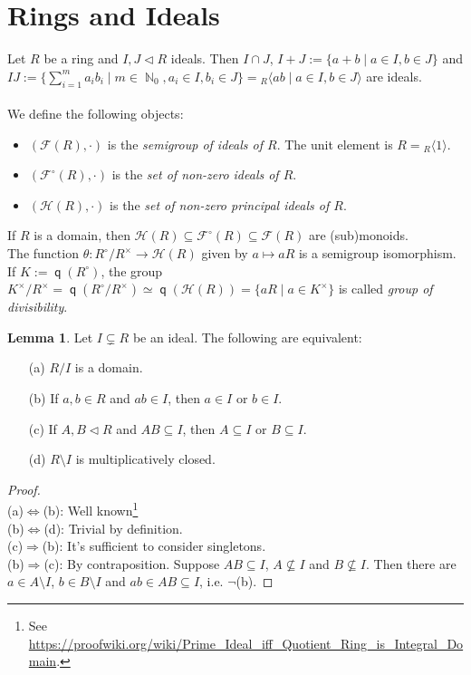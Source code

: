 \documentclass[12pt,a4paper]{report}
\theoremstyle{definition}
\newtheorem{lemma}[theorem]{Lemma}
\theoremstyle{num.custom-title}
\DeclareMathOperator{\N}{\mathbb{N}}
\DeclareMathOperator{\imp}{\Rightarrow}
\DeclareMathOperator{\sm}{\setminus}
\DeclareMathOperator{\sse}{\subseteq}
\DeclareMathOperator{\q}{\mathsf{q}}
\newcommand{\F}{\mathcal{F}}
\renewcommand{\H}{\mathcal{H}}
\renewcommand{\iff}{\Leftrightarrow}
\begin{document}
\section{Rings and Ideals}

Let $R$ be a ring and $I,J \lhd R$ ideals. Then $I \cap J$, $I+J := \{a+b \mid a \in I, b \in J\}$ and $IJ := \{\sum_{i=1}^m a_i b_i \mid m \in \N_0, a_i \in I, b_i \in J\} = {}_R\langle ab \mid a \in I, b \in J \rangle$ are ideals.\\
\\
We define the following objects:
\begin{itemize}
\item $(\F(R), \cdot)$ is the \emph{semigroup of ideals of $R$}. The unit element is $R={}_R\langle 1 \rangle$.
\item $(\F^\circ(R), \cdot)$ is the \emph{set of non-zero ideals of $R$}.
\item $(\H(R), \cdot)$ is the \emph{set of non-zero principal ideals of $R$}.
\end{itemize}

If $R$ is a domain, then $\H(R) \sse \F^\circ(R) \sse \F(R)$ are (sub)monoids.\\
The function $\theta : R^\circ / R^\times \to \H(R)$ given by $a \mapsto aR$ is a semigroup isomorphism.\\
If $K:=\q(R^\circ)$, the group $K^\times / R^\times = \q(R^\circ / R^\times) \simeq \q(\H(R)) = \{aR \mid a \in K^\times\}$ is called \emph{group of divisibility}.

\begin{lemma}\label{char_prime_ideals}
Let $I \subsetneq R$ be an ideal. The following are equivalent:
\begin{enumerate}
\item[(a)] $R/I$ is a domain.
\item[(b)] If $a,b \in R$ and $ab \in I$, then $a \in I$ or $b \in I$.
\item[(c)] If $A,B \lhd R$ and $AB \sse I$, then $A \sse I$ or $B \sse I$.
\item[(d)] $R \sm I$ is multiplicatively closed.
\end{enumerate}
\begin{proof}\ \\
(a)$\iff$(b): Well known\footnote{See \url{https://proofwiki.org/wiki/Prime_Ideal_iff_Quotient_Ring_is_Integral_Domain}.}\\
(b)$\iff$(d): Trivial by definition.\\
(c)$\imp$(b): It's sufficient to consider singletons.\\
(b)$\imp$(c): By contraposition. Suppose $AB \sse I$, $A \nsubseteq I$ and $B \nsubseteq I$. Then there are $a \in A \sm I$, $b \in B \sm I$ and $ab \in AB \sse I$, i.e. $\neg$(b).
\end{proof}
\end{lemma}
\end{document}
